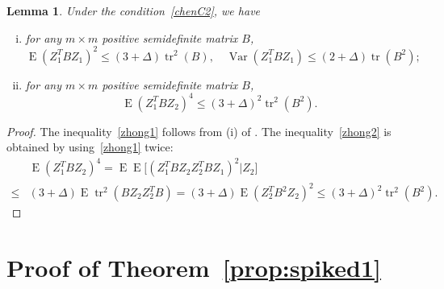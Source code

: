 \documentclass[3p]{elsarticle}
\DeclareMathOperator{\mytr}{tr}
\DeclareMathOperator{\myE}{E}
\DeclareMathOperator{\myVar}{Var}
\theoremstyle{plain}
\newtheorem{lemma}{Lemma}
\theoremstyle{definition}
\theoremstyle{remark}
\begin{document}
\begin{lemma}\label{lemma:zhong1}
    Under the condition~\eqref{chenC2}, we have
    \begin{enumerate}[(i)]
        \item
            for any $m\times m$ positive semidefinite matrix $B$,
            \begin{equation*}\label{zhong1}
            \myE(Z_1^T B Z_1)^2\leq (3+\Delta) \mytr^2(B),\quad
            \myVar(Z_1^T B Z_1)\leq (2+\Delta) \mytr(B^2);
            \end{equation*}
        \item
            for any $m\times m$ positive semidefinite matrix $B$,
            \begin{equation*}\label{zhong2}
                \myE (Z_1^T B Z_2)^4\leq (3+\Delta)^2\mytr^2 (B^2).
            \end{equation*}
    \end{enumerate}
\end{lemma}
\begin{proof}
    The inequality~\eqref{zhong1} follows from (i) of \citet[Proposition A.1]{songxi2010}.
    The inequality~\eqref{zhong2} is obtained by using~\eqref{zhong1} twice:
    $$
    \begin{aligned} 
        &\myE (Z_1^T B Z_2)^4
                =\myE\myE\big[ (Z_1^T B Z_2 Z_2^T B Z_1)^2|Z_2\big]
                \\
                \leq &
                (3+\Delta)\myE  \mytr^2 (B Z_2 Z_2^T B)
                =
                (3+\Delta)\myE  (Z_2^T B^2 Z_2 )^2
                \leq (3+\Delta)^2\mytr^2 (B^2).
    \end{aligned}
    $$

\end{proof}










\section{Proof of Theorem~\ref{prop:spiked1}}
\end{document}
